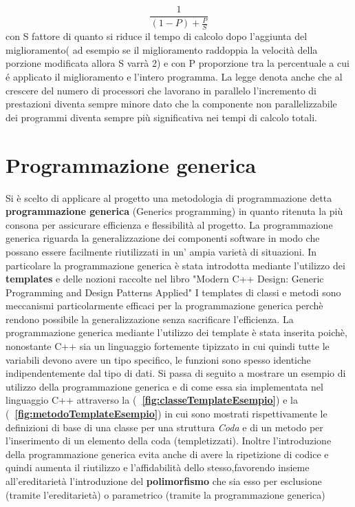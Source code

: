 {$$  {\frac {1}{(1-P)+{\frac {P}{S}}}}  $$ 
con S fattore di quanto si riduce il tempo di calcolo dopo l'aggiunta del miglioramento( ad esempio se il miglioramento raddoppia la velocit\`a della porzione modificata allora S varr\`a 2) e con P proporzione tra la percentuale a cui \'e applicato il miglioramento e l'intero programma.
La legge denota anche che al crescere del numero di processori che lavorano in parallelo l'incremento di prestazioni diventa sempre minore dato che la componente non parallelizzabile dei programmi diventa sempre pi\`u significativa nei tempi di calcolo totali.
\section{Programmazione generica}
Si \`e scelto di applicare al progetto una metodologia di programmazione detta \textbf{programmazione generica} (Generics programming) in quanto ritenuta la pi\`u consona per assicurare efficienza e flessibilit\`a al progetto. La programmazione generica riguarda la generalizzazione dei componenti software in modo che possano essere facilmente riutilizzati in un' ampia variet\`a di situazioni. In particolare la programmazione generica \`e stata introdotta mediante l'utilizzo dei \textbf{templates} e delle nozioni raccolte nel libro "Modern C++ Design: Generic Programming and Design Patterns Applied"\cite{GP:01}
I templates di classi e metodi sono meccanismi particolarmente efficaci per la programmazione generica perch\`e rendono possibile la generalizzazione senza sacrificare l'efficienza. La programmazione generica mediante l'utilizzo dei template \`e stata inserita poich\`e, nonostante C++ sia un linguaggio fortemente tipizzato in cui quindi tutte le variabili devono avere un tipo specifico, le funzioni sono spesso identiche indipendentemente dal tipo di dati.
Si passa di seguito a mostrare un esempio di utilizzo della programmazione generica e di come essa sia implementata nel linguaggio C++ attraverso la (\textbf{\figurename~\ref{fig:classeTemplateEsempio}}) e la (\textbf{\figurename~\ref{fig:metodoTemplateEsempio}}) in cui sono  mostrati rispettivamente le definizioni di base di una classe per una struttura \textit{Coda} e di un metodo per l'inserimento di un elemento della coda (templetizzati). Inoltre l'introduzione della programmazione generica evita anche di avere la ripetizione di codice e quindi aumenta il riutilizzo e l'affidabilit\`a dello stesso,favorendo insieme all'ereditariet\`a l'introduzione del \textbf{polimorfismo} che sia esso per esclusione (tramite l'ereditariet\`a) o parametrico (tramite la programmazione generica)

}
